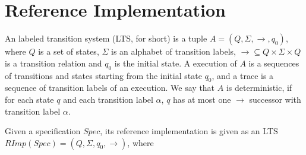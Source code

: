 
\section{Reference Implementation}
\label{sec:reference implementation}


An labeled transition system (LTS, for short) is a tuple $A = (Q,\Sigma,\rightarrow,q_0)$, where $Q$ is a set of states, $\Sigma$ is an alphabet of transition labels, $\rightarrow \subseteq Q \times \Sigma \times Q$ is a transition relation and $q_0$ is the initial state. A execution of $A$ is a sequences of transitions and states starting from the initial state $q_0$, and a trace is a sequence of transition labels of an execution. We say that $A$ is deterministic, if for each state $q$ and each transition label $\alpha$, $q$ has at most one $\rightarrow$ successor with transition label $\alpha$. 

Given a specification $Spec$, its reference implementation is given as an LTS $RImp(Spec) = (Q,\Sigma,q_0,\rightarrow)$, where


